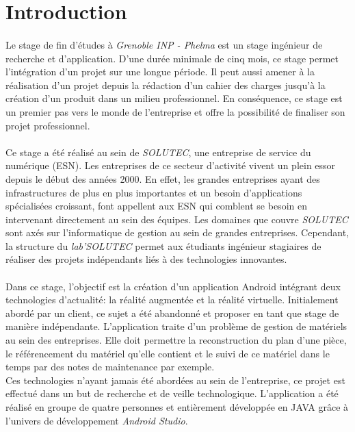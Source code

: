 \pagebreak %
\section{Introduction}
	
	\paragraph{}
	Le stage de fin d'études à \textit{Grenoble INP - Phelma} est un stage ingénieur de recherche et d'application. D'une durée minimale de cinq mois, ce stage permet l'intégration d'un projet sur une longue période. Il peut aussi amener à la réalisation d'un projet depuis la rédaction d'un cahier des charges jusqu'à la création d'un produit dans un milieu professionnel. En conséquence, ce stage est un premier pas vers le monde de l'entreprise et offre la possibilité de finaliser son projet professionnel. 
	
	\paragraph{}
	Ce stage a été réalisé au sein de \textit{SOLUTEC}, une entreprise de service du numérique (ESN). Les entreprises de ce secteur d'activité vivent un plein essor depuis le début des années 2000. En effet, les grandes entreprises ayant des infrastructures de plus en plus importantes et un besoin d’applications spécialisées croissant, font appellent aux ESN qui comblent se besoin en intervenant directement au sein des équipes.
	Les domaines que couvre \textit{SOLUTEC} sont axés sur l'informatique de gestion au sein de grandes entreprises. Cependant, la structure du \textit{lab'SOLUTEC} permet aux étudiants ingénieur stagiaires de réaliser des projets indépendants liés à des technologies innovantes.

	\paragraph{}
	Dans ce stage, l'objectif est la création d'un application Android intégrant deux technologies d'actualité: la réalité augmentée et la réalité virtuelle. Initialement abordé par un client, ce sujet a été abandonné et proposer en tant que stage de manière indépendante. L'application traite d'un problème de gestion de matériels au sein des entreprises. Elle doit permettre la reconstruction du plan d'une pièce, le référencement du matériel qu'elle contient et le suivi de ce matériel dans le temps par des notes de maintenance par exemple.\\
	Ces technologies n'ayant jamais été abordées au sein de l'entreprise, ce projet est effectué dans un but de recherche et de veille technologique.
	L'application a été réalisé en groupe de quatre personnes et entièrement développée en JAVA grâce à l'univers de développement \textit{Android Studio}.

